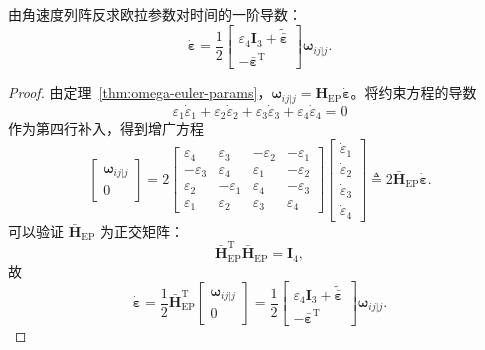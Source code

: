 \begin{theorem}[由角速度反求欧拉参数导数]\label{thm:ep-inverse-omega}
	由角速度列阵反求欧拉参数对时间的一阶导数：
	$$
	\dot{\boldsymbol{\varepsilon}}=\frac{1}{2}
	\begin{bmatrix}
		\varepsilon_4\boldsymbol{I}_3+\tilde{\bar{\boldsymbol{\varepsilon}}}\\
		-\bar{\boldsymbol{\varepsilon}}^{\mathrm{T}}
	\end{bmatrix}
	\boldsymbol{\omega}_{ij|j}.
	$$
\end{theorem}

\begin{proof}
	由定理~\ref{thm:omega-euler-params}，$\boldsymbol{\omega}_{ij|j}=\boldsymbol{H}_{\mathrm{EP}}\dot{\boldsymbol{\varepsilon}}$。将约束方程的导数
	$$
	\varepsilon_1\dot{\varepsilon}_1+\varepsilon_2\dot{\varepsilon}_2+\varepsilon_3\dot{\varepsilon}_3+\varepsilon_4\dot{\varepsilon}_4=0
	$$
	作为第四行补入，得到增广方程
	$$
	\begin{bmatrix}
		\boldsymbol{\omega}_{ij|j}\\
		0
	\end{bmatrix}
	=2
	\begin{bmatrix}
		\varepsilon_4 & \varepsilon_3 & -\varepsilon_2 & -\varepsilon_1\\
		-\varepsilon_3 & \varepsilon_4 & \varepsilon_1 & -\varepsilon_2\\
		\varepsilon_2 & -\varepsilon_1 & \varepsilon_4 & -\varepsilon_3\\
		\varepsilon_1 & \varepsilon_2 & \varepsilon_3 & \varepsilon_4
	\end{bmatrix}
	\begin{bmatrix}
		\dot{\varepsilon}_1\\ \dot{\varepsilon}_2\\ \dot{\varepsilon}_3\\ \dot{\varepsilon}_4
	\end{bmatrix}
	\triangleq 2\bar{\boldsymbol{H}}_{\mathrm{EP}}\dot{\boldsymbol{\varepsilon}}.
	$$
	可以验证 $\bar{\boldsymbol{H}}_{\mathrm{EP}}$ 为正交矩阵：
	$$
	\bar{\boldsymbol{H}}_{\mathrm{EP}}^{\mathrm{T}}\bar{\boldsymbol{H}}_{\mathrm{EP}}=\boldsymbol{I}_4,
	$$
	故
	$$
	\dot{\boldsymbol{\varepsilon}}
	=\frac{1}{2}\bar{\boldsymbol{H}}_{\mathrm{EP}}^{\mathrm{T}}
	\begin{bmatrix}
		\boldsymbol{\omega}_{ij|j}\\ 0
	\end{bmatrix}
	=\frac{1}{2}
	\begin{bmatrix}
		\varepsilon_4\boldsymbol{I}_3+\tilde{\bar{\boldsymbol{\varepsilon}}}\\
		-\bar{\boldsymbol{\varepsilon}}^{\mathrm{T}}
	\end{bmatrix}
	\boldsymbol{\omega}_{ij|j}.
	$$
\end{proof}